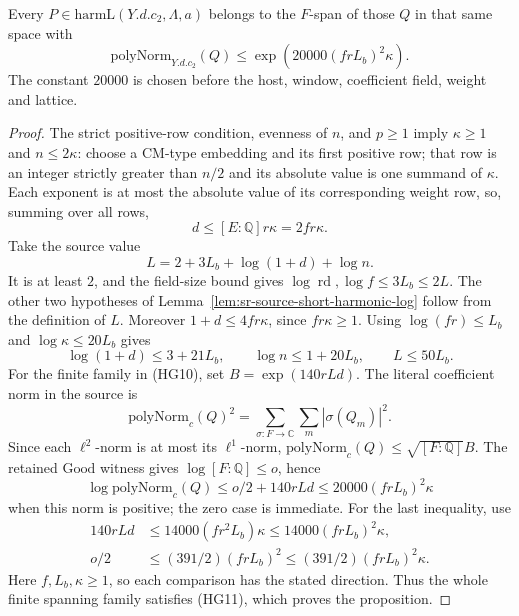 \begin{srproposition}\label{prop:sr-source-harmonic-20000}
Every \(P\in\mathrm{harmL}(Y.d.c_2,\Lambda,a)\) belongs
to the \(F\)-span of those \(Q\) in that same space with
\[
 \mathrm{polyNorm}_{Y.d.c_2}(Q)
       \le \exp\!\left(20000(frL_b)^2\kappa\right).
 \tag{HG11}\label{eq:sr-source-harmonic-20000}
\]
The constant \(20000\) is chosen before the host,
window, coefficient field, weight and lattice.
\end{srproposition}
\begin{proof}
The strict positive-row condition, evenness of \(n\),
and \(p\ge1\) imply \(\kappa\ge1\) and \(n\le2\kappa\):
choose a CM-type embedding and its first positive row;
that row is an integer strictly greater than \(n/2\)
and its absolute value is one summand of \(\kappa\).
Each exponent is at most the absolute value of its
corresponding weight row, so, summing over all rows,
\[
                d\le [E:\mathbb Q]r\kappa=2fr\kappa.
\]
Take the source value
\[
 L=2+3L_b+\log(1+d)+\log n.
\]
It is at least \(2\), and the field-size bound gives
\(\log\operatorname{rd},\log f\le3L_b\le2L\).
The other two hypotheses of
Lemma~\ref{lem:sr-source-short-harmonic-log} follow
from the definition of \(L\).
Moreover \(1+d\le4fr\kappa\), since \(fr\kappa\ge1\).
Using \(\log(fr)\le L_b\) and
\(\log\kappa\le20L_b\) gives
\[
 \log(1+d)\le3+21L_b,\qquad
 \log n\le1+20L_b,\qquad L\le50L_b .
\]
For the finite family in (HG10), set
\(B=\exp(140rLd)\).
The literal coefficient norm in the source is
\[
 \mathrm{polyNorm}_c(Q)^2
       =\sum_{\sigma:F\to\mathbb C}\sum_m|\sigma(Q_m)|^2.
\]
Since each \(\ell^2\)-norm is at most its
\(\ell^1\)-norm,
\(\mathrm{polyNorm}_c(Q)\le\sqrt{[F:\mathbb Q]}B\).
The retained \(\mathrm{Good}\) witness gives
\(\log[F:\mathbb Q]\le o\), hence
\[
 \log\mathrm{polyNorm}_c(Q)
             \le o/2+140rLd
             \le20000(frL_b)^2\kappa
\]
when this norm is positive; the zero case is immediate.
For the last inequality, use
\[
 \begin{split}
 140rLd&\le14000(fr^2L_b)\kappa
                      \le14000(frL_b)^2\kappa,\\
 o/2&\le(391/2)(frL_b)^2
                      \le(391/2)(frL_b)^2\kappa .
 \end{split}
\]
Here \(f,L_b,\kappa\ge1\), so each comparison has
the stated direction.
Thus the whole finite spanning family satisfies
(HG11), which proves the proposition.
\end{proof}

